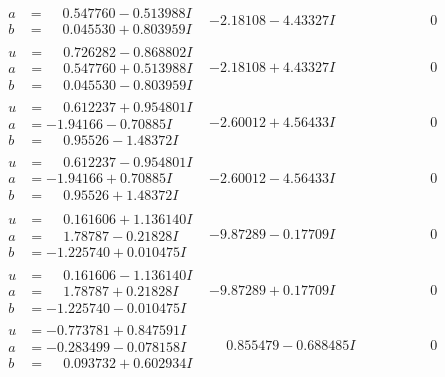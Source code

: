 \documentclass[1p]{elsarticle_modified}
\theoremstyle{definition}
\begin{document}
$$\begin{array}{c|c|c}
\begin{aligned}
a &= \phantom{-}0.547760 - 0.513988 I \\
b &= \phantom{-}0.045530 + 0.803959 I\end{aligned}
 & -2.18108 - 4.43327 I & \phantom{-0.000000 } 0 \\ \hline\begin{aligned}
u &= \phantom{-}0.726282 - 0.868802 I \\
a &= \phantom{-}0.547760 + 0.513988 I \\
b &= \phantom{-}0.045530 - 0.803959 I\end{aligned}
 & -2.18108 + 4.43327 I & \phantom{-0.000000 } 0 \\ \hline\begin{aligned}
u &= \phantom{-}0.612237 + 0.954801 I \\
a &= -1.94166 - 0.70885 I \\
b &= \phantom{-}0.95526 - 1.48372 I\end{aligned}
 & -2.60012 + 4.56433 I & \phantom{-0.000000 } 0 \\ \hline\begin{aligned}
u &= \phantom{-}0.612237 - 0.954801 I \\
a &= -1.94166 + 0.70885 I \\
b &= \phantom{-}0.95526 + 1.48372 I\end{aligned}
 & -2.60012 - 4.56433 I & \phantom{-0.000000 } 0 \\ \hline\begin{aligned}
u &= \phantom{-}0.161606 + 1.136140 I \\
a &= \phantom{-}1.78787 - 0.21828 I \\
b &= -1.225740 + 0.010475 I\end{aligned}
 & -9.87289 - 0.17709 I & \phantom{-0.000000 } 0 \\ \hline\begin{aligned}
u &= \phantom{-}0.161606 - 1.136140 I \\
a &= \phantom{-}1.78787 + 0.21828 I \\
b &= -1.225740 - 0.010475 I\end{aligned}
 & -9.87289 + 0.17709 I & \phantom{-0.000000 } 0 \\ \hline\begin{aligned}
u &= -0.773781 + 0.847591 I \\
a &= -0.283499 - 0.078158 I \\
b &= \phantom{-}0.093732 + 0.602934 I\end{aligned}
 & \phantom{-}0.855479 - 0.688485 I & \phantom{-0.000000 } 0 \\ \hline\begin{aligned}

\end{aligned}
\end{array}$$
\end{document}
